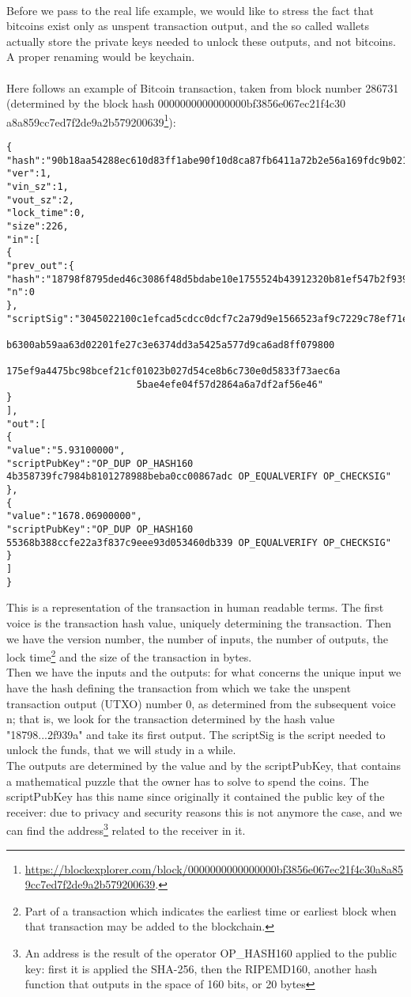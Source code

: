 \\
Before we pass to the real life example, we would like to stress the fact that bitcoins exist only as unspent transaction output, and the so called wallets actually store the private keys needed to unlock these outputs, and not bitcoins. A proper renaming would be keychain.
\\
\\
Here follows an example of Bitcoin transaction, taken from block number 286731 (determined by the block hash 0000000000000000bf3856e067ec21f4c30 a8a859cc7ed7f2de9a2b579200639\footnote{\url{https://blockexplorer.com/block/0000000000000000bf3856e067ec21f4c30a8a859cc7ed7f2de9a2b579200639}.}):

\begin{lstlisting}[frame=single]
{
"hash":"90b18aa54288ec610d83ff1abe90f10d8ca87fb6411a72b2e56a169fdc9b0219",
"ver":1,
"vin_sz":1,
"vout_sz":2,
"lock_time":0,
"size":226,
"in":[
{
"prev_out":{
"hash":"18798f8795ded46c3086f48d5bdabe10e1755524b43912320b81ef547b2f939a",
"n":0
},
"scriptSig":"3045022100c1efcad5cdcc0dcf7c2a79d9e1566523af9c7229c78ef71ee8 
					   b6300ab59aa63d02201fe27c3e6374dd3a5425a577d9ca6ad8ff079800
					   175ef9a4475bc98bcef21cf01023b027d54ce8b6c730e0d5833f73aec6a
					   5bae4efe04f57d2864a6a7df2af56e46"
}
],
"out":[
{
"value":"5.93100000",
"scriptPubKey":"OP_DUP OP_HASH160 4b358739fc7984b8101278988beba0cc00867adc OP_EQUALVERIFY OP_CHECKSIG"
},
{
"value":"1678.06900000",
"scriptPubKey":"OP_DUP OP_HASH160 55368b388ccfe22a3f837c9eee93d053460db339 OP_EQUALVERIFY OP_CHECKSIG"
}
]
}
\end{lstlisting}
This is a representation of the transaction in human readable terms. The first voice is the transaction hash value, uniquely determining the transaction. Then we have the version number, the number of inputs, the number of outputs, the lock time\footnote{Part of a transaction which indicates the earliest time or earliest block when that transaction may be added to the blockchain.} and the size of the transaction in bytes.
\\
Then we have the inputs and the outputs: for what concerns the unique input we have the hash defining the transaction from which we take the unspent transaction output (UTXO) number 0, as determined from the subsequent voice n; that is, we look for the transaction determined by the hash value "18798...2f939a" and take its first output. The scriptSig is the script needed to unlock the funds, that we will study in a while.
\\
The outputs are determined by the value and by the scriptPubKey, that contains a mathematical puzzle that the owner has to solve to spend the coins. The scriptPubKey has this name since originally it contained the public key of the receiver: due to privacy and security reasons this is not anymore the case, and we can find the address\footnote{An address is the result of the operator OP\_HASH160 applied to the public key: first it is applied the SHA-256, then the RIPEMD160, another hash function that outputs in the space of 160 bits, or 20 bytes} related to the receiver in it. 


